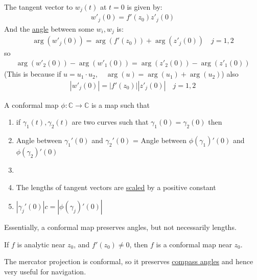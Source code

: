 \begin{proposition}
    The tangent vector to $w_j(t)$ at $t = 0$ is given by:
    \begin{align*}
        w'_j(0) = f'(z_0)z'_j(0)
    \end{align*}
    And the \underline{angle} between some $w_i, w_j$ is:
    \begin{align}
        \arg(w'_j(0)) = \arg(f'(z_0)) + \arg(z'_j(0)) \quad j = 1, 2
    \end{align}
    so
    \begin{align}
        \arg(w'_2(0)) - \arg(w'_1(0)) = \arg(z'_2(0)) - \arg(z'_1(0))
    \end{align}
    (This is because if $u = u_1\cdot u_2, \quad \arg(u) = \arg(u_1) + \arg(u_2)$)
    also
    \begin{align}
        |w'_j(0)| = |f'(z_0)||z'_j(0)| \quad j = 1,2
    \end{align}
\end{proposition}

\begin{definition}
    A conformal map $\phi : \mathbb{C} \to \mathbb{C}$ is a map such that
    \begin{enumerate}
        \item if $\gamma_1(t), \gamma_2(t)$ are two curves such that $\gamma_1(0) = \gamma_2(0)$ then
        \item[] Angle between $\gamma_1'(0)$ and $\gamma_2'(0)$ = Angle between $\phi(\gamma_1)'(0)$ and $\phi(\gamma_2)'(0)$
        \item[]
        \item The lengths of tangent vectors are \underline{scaled} by a positive constant
        \item[] $|\gamma_j'(0)|c = |\phi(\gamma_j)'(0)|$
    \end{enumerate}
    Essentially, a conformal map preserves angles, but not necessarily lengths.
\end{definition}

\begin{theorem}
    If $f$ is analytic near $z_0$, and $f'(z_0) \neq 0$, then $f$ is a conformal map near $z_0$.
\end{theorem}

\begin{example}
    The mercator projection is conformal, so it preserves \underline{compass angles} and hence very useful for navigation.
\end{example}
